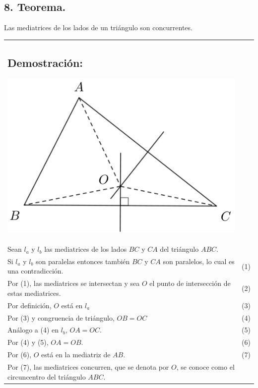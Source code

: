 \documentclass[12pt,a4paper]{article}
\begin{document}
\subsection*{8. Teorema.}
Las mediatrices de los lados de un triángulo son concurrentes.\\
\begin{tabular}{p{15.9cm}p{1cm}}
\subsection*{Demostración:}
\begin{center}
\includegraphics[scale=0.6]{Imagenes/mediatriz.png} 
\end{center}
\\Sean $l_a$ y $l_b$ las mediatrices de los lados $BC$ y $CA$ del triángulo $ABC.$
\\Si $l_a$ y $l_b$ son paralelas entonces también $BC$ y $CA$ son paralelos, lo cual es una contradicción. &\medskip(1)
\\Por (1), las mediatrices se intersectan y sea $O$ el punto de intersección de estas mediatrices. & (2) 
\\Por definición, $O$ está en $l_a$ &(3)
\\Por (3) y congruencia de triángulo, $OB=OC$ &(4)
\\ Análogo a (4) en $l_b$, $OA=OC$. &(5)
\\Por (4) y (5), $OA=OB$. &(6)
\\Por (6), $O$ está en la mediatriz de $AB$. &(7)
\\ Por (7), las mediatrices concurren, que se denota por $O$, se conoce como el circuncentro del triángulo $ABC$. 
\end{tabular}
\end{document}
